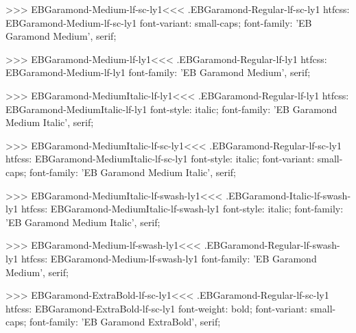 {{>>>
\<EBGaramond-Medium-lf-sc-ly1\><<<
.EBGaramond-Regular-lf-sc-ly1
htfcss:  EBGaramond-Medium-lf-sc-ly1  font-variant: small-caps; font-family: 'EB Garamond Medium', serif;

>>>
\<EBGaramond-Medium-lf-ly1\><<<
.EBGaramond-Regular-lf-ly1
htfcss:  EBGaramond-Medium-lf-ly1  font-family: 'EB Garamond Medium', serif;

>>>
\<EBGaramond-MediumItalic-lf-ly1\><<<
.EBGaramond-Regular-lf-ly1
htfcss:  EBGaramond-MediumItalic-lf-ly1  font-style: italic; font-family: 'EB Garamond Medium Italic', serif;

>>>
\<EBGaramond-MediumItalic-lf-sc-ly1\><<<
.EBGaramond-Regular-lf-sc-ly1
htfcss:  EBGaramond-MediumItalic-lf-sc-ly1  font-style: italic; font-variant: small-caps; font-family: 'EB Garamond Medium Italic', serif;

>>>
\<EBGaramond-MediumItalic-lf-swash-ly1\><<<
.EBGaramond-Italic-lf-swash-ly1
htfcss:  EBGaramond-MediumItalic-lf-swash-ly1  font-style: italic; font-family: 'EB Garamond Medium Italic', serif;

>>>
\<EBGaramond-Medium-lf-swash-ly1\><<<
.EBGaramond-Regular-lf-swash-ly1
htfcss:  EBGaramond-Medium-lf-swash-ly1  font-family: 'EB Garamond Medium', serif;

>>>
\<EBGaramond-ExtraBold-lf-sc-ly1\><<<
.EBGaramond-Regular-lf-sc-ly1
htfcss:  EBGaramond-ExtraBold-lf-sc-ly1  font-weight: bold; font-variant: small-caps; font-family: 'EB Garamond ExtraBold', serif;

}}
